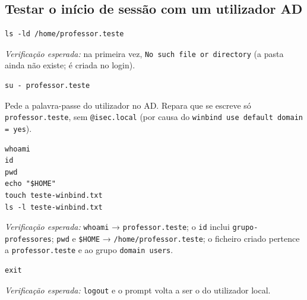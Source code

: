 
\subsection[Testar o início de sessão com um utilizador AD]{Testar o início de sessão com um utilizador AD}



\begin{lstlisting}[style=bashstyle]
ls -ld /home/professor.teste
\end{lstlisting}

\emph{Verificação esperada:} na primeira vez, \texttt{No such file or directory} (a pasta ainda não existe; é criada no login).


\begin{lstlisting}[style=bashstyle]
su - professor.teste
\end{lstlisting}

Pede a palavra-passe do utilizador no AD. Repara que se escreve só \texttt{professor.teste}, sem \texttt{@isec.local} (por causa do \texttt{winbind use default domain = yes}).


\begin{lstlisting}[style=bashstyle]
whoami
id
pwd
echo "$HOME"
touch teste-winbind.txt
ls -l teste-winbind.txt
\end{lstlisting}

\emph{Verificação esperada:} \texttt{whoami} → \texttt{professor.teste}; o \texttt{id} inclui \texttt{grupo-professores}; \texttt{pwd} e \texttt{\$HOME} → \texttt{/\allowbreak{}home/\allowbreak{}professor.teste}; o ficheiro criado pertence a \texttt{professor.teste} e ao grupo \texttt{domain users}.


\begin{lstlisting}[style=bashstyle]
exit
\end{lstlisting}

\emph{Verificação esperada:} \texttt{logout} e o prompt volta a ser o do utilizador local.

